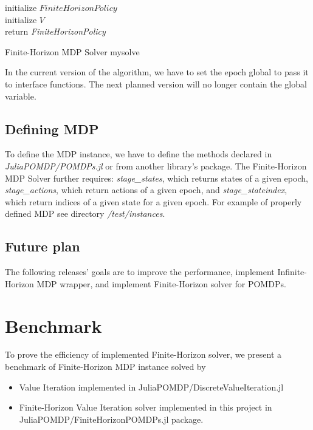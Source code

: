  \LinesNumbered
\begin{algorithm}
\SetAlgoLined
initialize $FiniteHorizonPolicy$ \\
initialize $V$ \\
return \textit{FiniteHorizonPolicy}
\caption{Finite-Horizon MDP Solver mysolve}
\end{algorithm}

In the current version of the algorithm, we have to set the epoch global to pass it to interface functions. The next planned version will no longer contain the global variable.

\subsection{Defining MDP}

To define the MDP instance, we have to define the methods declared in \textit{JuliaPOMDP/POMDPs.jl} \cite{JMLR:v18:16-300} or from another library's package. The Finite-Horizon MDP Solver further requires: \textit{stage\_states}, which returns states of a given epoch, \textit{stage\_actions}, which return actions of a given epoch, and \textit{stage\_stateindex}, which return indices of a given state for a given epoch. For example of properly defined MDP see directory \textit{/test/instances}.
 

\subsection{Future plan}

The following releases' goals are to improve the performance, implement Infinite-Horizon MDP wrapper, and implement Finite-Horizon solver for POMDPs.


\section{Benchmark}
To prove the efficiency of implemented Finite-Horizon solver, we present a benchmark of Finite-Horizon MDP instance solved by
\begin{itemize}
    \item Value Iteration implemented in JuliaPOMDP/DiscreteValueIteration.jl
    \item Finite-Horizon Value Iteration solver implemented in this project in JuliaPOMDP/FiniteHorizonPOMDPs.jl package.
\end{itemize}

